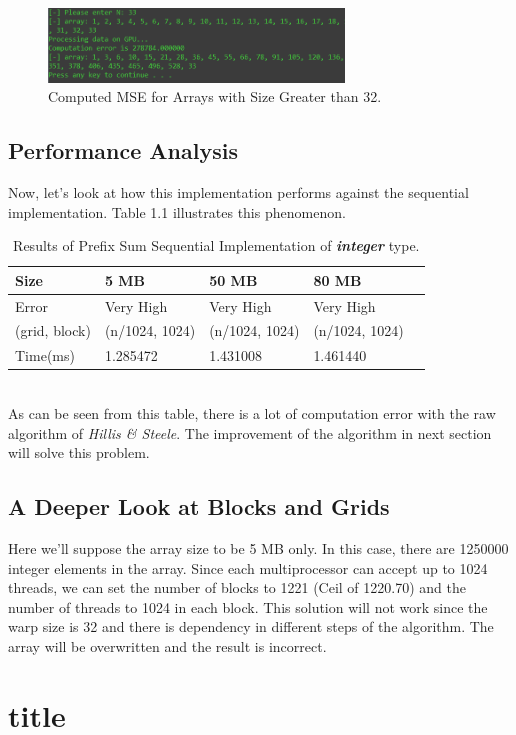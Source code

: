 \documentclass[12pt]{article}
\numberwithin{equation}{section}
\numberwithin{table}{section}
\numberwithin{figure}{section}
\begin{document}
\begin{figure}[!h]\centering
	\includegraphics[width=0.7\textwidth]{1_3.png}
	\caption{Computed MSE for Arrays with Size Greater than 32.}
	\label{pl1}
\end{figure}
\newpage
\subsection{Performance Analysis}
Now, let's look at how this implementation performs against the sequential implementation. Table 1.1 illustrates this phenomenon.
\def\arraystretch{1.3}
\begin{table}[!h]
	\centering
	\begin{tabular}{ |p{3cm}||p{3cm}|p{3cm}|p{3cm}|p{2cm}|}

		\hline
		Size & 5 MB & 50 MB & 80 MB &\\
		\hline
		Error   & Very High    & Very High & Very High  & \\
		\hline
		(grid, block)   &  (n/1024, 1024)    &  (n/1024, 1024) &  (n/1024, 1024)&\\
		\hline
		Time(ms)   &   1.285472    &   1.431008 &  1.461440&\\
		\hline
	\end{tabular}
	\caption{Results of Prefix Sum Sequential Implementation of \textit{\textbf{integer}} type.}
	\label{figsolplot}
\end{table}\\
As can be seen from this table, there is a lot of computation error with the raw algorithm of \textit{Hillis \& Steele}. The improvement of the algorithm in next section will solve this problem.

\subsection{A Deeper Look at Blocks and Grids}
Here we'll suppose the array size to be 5 MB only. In this case, there are 1250000 integer elements in the array. Since each multiprocessor can accept up to 1024 threads, we can set the number of blocks to 1221 (Ceil of 1220.70) and the number of threads to 1024 in each block. This solution will not work since the warp size is 32 and there is dependency in different steps of the algorithm. The array will be overwritten and the result is incorrect.

\section{title}
\end{document}
